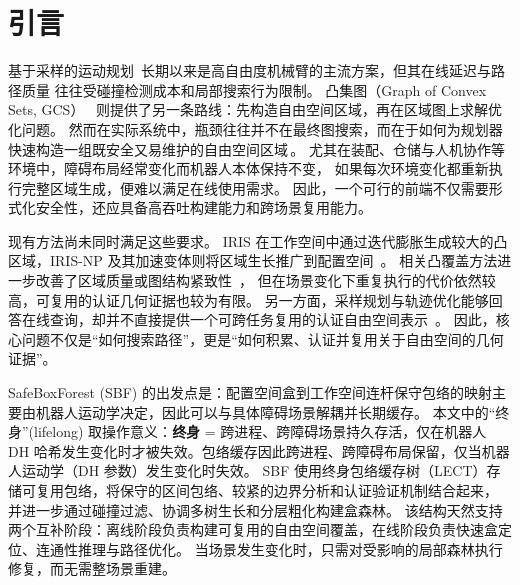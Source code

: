 \documentclass[journal]{IEEEtran}
\begin{document}
\section{引言}
\label{sec:intro}

基于采样的运动规划~\cite{lavalle2006planning,lavalle1998rapidly,%
kavraki1996probabilistic}长期以来是高自由度机械臂的主流方案，但其在线延迟与路径质量
往往受碰撞检测成本和局部搜索行为限制。
凸集图（Graph of Convex Sets, GCS）~\cite{marcucci2024motion}
则提供了另一条路线：先构造自由空间区域，再在区域图上求解优化问题。
然而在实际系统中，瓶颈往往并不在最终图搜索，而在于如何为规划器快速构造一组既安全又易维护的自由空间区域\,\cite{deits2015computing,werner2024fast}。
尤其在装配、仓储与人机协作等环境中，障碍布局经常变化而机器人本体保持不变，
如果每次环境变化都重新执行完整区域生成，便难以满足在线使用需求。
因此，一个可行的前端不仅需要形式化安全性，还应具备高吞吐构建能力和跨场景复用能力。

现有方法尚未同时满足这些要求。
IRIS 在工作空间中通过迭代膨胀生成较大的凸区域，IRIS-NP 及其加速变体则将区域生长推广到配置空间~\cite{deits2015computing,werner2024fast,werner2024irisze}。
相关凸覆盖方法进一步改善了区域质量或图结构紧致性~\cite{amice2024clique,werner2024vcd}，
但在场景变化下重复执行的代价依然较高，可复用的认证几何证据也较为有限。
另一方面，采样规划与轨迹优化能够回答在线查询，却并不直接提供一个可跨任务复用的认证自由空间表示~\cite{lavalle1998rapidly,kuffner2000rrt,gammell2020batch,ratliff2009chomp,schulman2014motion,toussaint2017newton}。
因此，核心问题不仅是“如何搜索路径”，更是“如何积累、认证并复用关于自由空间的几何证据”。

SafeBoxForest (SBF) 的出发点是：配置空间盒到工作空间连杆保守包络的映射主要由机器人运动学决定，因此可以与具体障碍场景解耦并长期缓存。
本文中的``终身''(lifelong) 取操作意义：\textbf{终身} = 跨进程、跨障碍场景持久存活，仅在机器人 DH 哈希发生变化时才被失效。包络缓存因此跨进程、跨障碍布局保留，仅当机器人运动学（DH 参数）发生变化时失效。
SBF 使用终身包络缓存树（LECT）存储可复用包络，将保守的区间包络、较紧的边界分析和认证验证机制结合起来，
并进一步通过碰撞过滤、协调多树生长和分层粗化构建盒森林。
该结构天然支持两个互补阶段：离线阶段负责构建可复用的自由空间覆盖，在线阶段负责快速盒定位、连通性推理与路径优化。
当场景发生变化时，只需对受影响的局部森林执行修复，而无需整场景重建。
\end{document}
